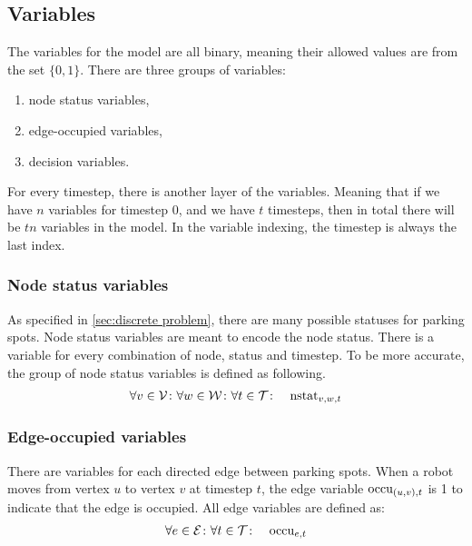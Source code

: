 \subsection{Variables}
\label{sec:variables}
The variables for the model are all binary, meaning their allowed values are from the set
$\{0,1\}$. There are three groups of variables:
\begin{enumerate}
    \item node status variables,
    \item edge-occupied variables,
    \item decision variables.
\end{enumerate}
For every timestep, there is another layer of the variables. Meaning that if
we have $n$ variables for timestep $0$, and we have $t$ timesteps, then in total
there will be $tn$ variables in the model. In the variable indexing, the
timestep is always the last index.

\subsubsection{Node status variables}
As specified in \autoref{sec:discrete problem}, there are many possible statuses
for parking spots. Node status variables are meant to encode the node status.
There is a variable for every combination of node, status and timestep. To be
more accurate, the group of node status variables is defined as following.
\begin{align}
    &\forall v \in \mathcal{V} \colon \forall w \in \mathcal{W} \colon \forall t \in \mathcal{T} \colon &
    \mathrm{nstat}_{v,w,t}
\end{align}

\subsubsection{Edge-occupied variables}
There are variables for each directed edge between parking spots. When a robot
moves from vertex $u$ to vertex $v$ at timestep $t$, the edge variable
$\mathrm{occu}_{(u,v),t}$ is 1 to indicate that the edge is occupied. All edge variables
are defined as:
\begin{align}
    &\forall e \in \mathcal{E} \colon \forall t \in \mathcal{T} \colon & \mathrm{occu}_{e,t}
\end{align}

